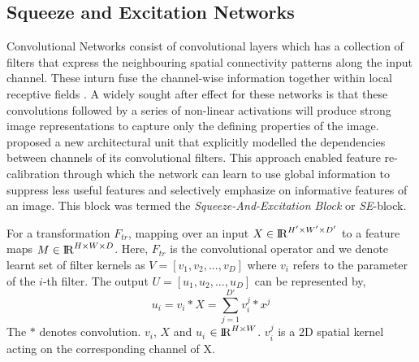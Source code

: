 \documentclass[fleqn,usenatbib]{mnras}
\begin{document}
\subsection{Squeeze and Excitation Networks}
\hspace{0.25 in}Convolutional Networks consist of convolutional layers which has a collection of filters that express the neighbouring spatial connectivity patterns along the input channel. These inturn fuse the channel-wise information together within local receptive fields \citep{hu2018squeeze}. A widely sought after effect for these networks is that these convolutions followed by a series of non-linear activations will produce strong image representations to capture only the defining properties of the image. \citet{hu2018squeeze} proposed a new architectural unit that explicitly modelled the dependencies between channels of its convolutional filters. This approach enabled feature re-calibration through which the network can learn to use global information to suppress less useful features and selectively emphasize on informative features of an image. This block was termed the \textit{Squeeze-And-Excitation Block} or \textit{SE}-block.

For a transformation $F_{tr}$, mapping over an input $X \in {\rm I\!R}^{H'\times W' \times D'}$ to a feature maps $M\in {\rm I\!R}^{H\times W \times D}$. Here, $F_{tr}$ is the convolutional operator and we denote learnt set of filter kernels as $V = [v_1, v_2, ..., v_D]$ where $v_i$ refers to the parameter of the $i$-th filter. The output $U = [u_1, u_2, ..., u_D]$ can be represented by,
\begin{equation}
    u_i = v_i \ast X = \sum_{j=1}^{D'}{v_i^j \ast x^j}
    \label{SE convolutional eqn}
\end{equation}
\hspace{0.25 in}The $\ast$ denotes convolution. $v_i$, $X$ and $u_i$ $\in {\rm I\!R}^{H\times W}$. $v_i^j$ is a 2D spatial kernel acting on the corresponding channel of X.
\end{document}
